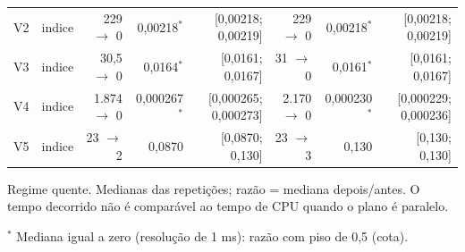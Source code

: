 {\begin{tabular}{llrrrrrr}
V2 & indice & 229 $\to$ 0 & 0,00218$^{*}$ & [0,00218; 0,00219] & 229 $\to$ 0 & 0,00218$^{*}$ & [0,00218; 0,00219] \\
V3 & indice & 30,5 $\to$ 0 & 0,0164$^{*}$ & [0,0161; 0,0167] & 31 $\to$ 0 & 0,0161$^{*}$ & [0,0161; 0,0167] \\
V4 & indice & 1.874 $\to$ 0 & 0,000267$^{*}$ & [0,000265; 0,000273] & 2.170 $\to$ 0 & 0,000230$^{*}$ & [0,000229; 0,000236] \\
V5 & indice & 23 $\to$ 2 & 0,0870 & [0,0870; 0,130] & 23 $\to$ 3 & 0,130 & [0,130; 0,130] \\
\bottomrule
\end{tabular}\par
\vspace{3pt}
\begin{minipage}{\linewidth}\footnotesize
Regime quente. Medianas das repetições; razão = mediana depois/antes. O tempo decorrido não é comparável ao tempo de CPU quando o plano é paralelo.\par
$^{*}$ Mediana igual a zero (resolução de 1 ms): razão com piso de 0,5 (cota).
\end{minipage}
}
